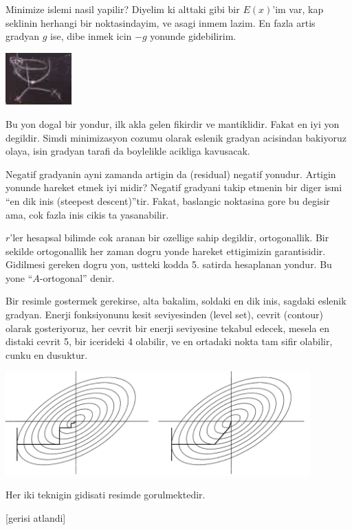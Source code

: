 \documentclass[12pt,fleqn]{article}\usepackage{../common}
\begin{document}
Minimize islemi nasil yapilir? Diyelim ki alttaki gibi bir $E(x)$'im var,
kap seklinin herhangi bir noktasindayim, ve asagi inmem lazim. En fazla
artis gradyan $g$ ise, dibe inmek icin $-g$ yonunde gidebilirim. 

\includegraphics[height=2cm]{19_1.png}

Bu yon dogal bir yondur, ilk akla gelen fikirdir ve mantiklidir. Fakat en
iyi yon degildir. Simdi minimizasyon cozumu olarak eslenik gradyan
acisindan bakiyoruz olaya, isin gradyan tarafi da boylelikle acikliga
kavusacak. 

Negatif gradyanin ayni zamanda artigin da (residual) negatif
yonudur. Artigin yonunde hareket etmek iyi midir? Negatif gradyani takip
etmenin bir diger ismi ``en dik inis (steepest descent)''tir. Fakat,
baslangic noktasina gore bu degisir ama, cok fazla inis cikis ta
yasanabilir.

$r$'ler hesapsal bilimde cok aranan bir ozellige sahip degildir,
ortogonallik. Bir sekilde ortogonallik her zaman dogru yonde hareket
ettigimizin garantisidir. Gidilmesi gereken dogru yon, ustteki kodda
5. satirda hesaplanan yondur. Bu yone ``$A$-ortogonal'' denir. 

Bir resimle gostermek gerekirse, alta bakalim, soldaki en dik inis, sagdaki
eslenik gradyan. Enerji fonksiyonunu kesit seviyesinden (level set), cevrit
(contour) olarak gosteriyoruz, her cevrit bir enerji seviyesine tekabul
edecek, mesela en distaki cevrit 5, bir icerideki 4 olabilir, ve en
ortadaki nokta tam sifir olabilir, cunku en dusuktur. 

\includegraphics[height=4cm]{19_2.png}

Her iki teknigin gidisati resimde gorulmektedir. 



[gerisi atlandi]
\end{document}
